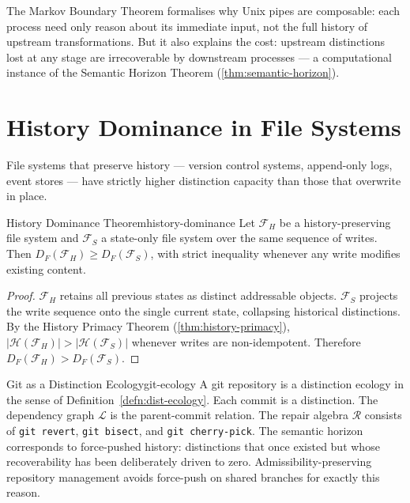 \documentclass[12pt,twoside,openright]{book}
\newcommand{\csicon} {\marginpar{\tiny\color{DistBlue}\faCode}}
\newcommand{\bioicon}{\marginpar{\tiny\color{DistTeal}\faDna}}
\newcommand{\hist}{\mathcal{H}}
\begin{document}
\noindent
The Markov Boundary Theorem formalises why Unix
pipes are composable: each process need only reason about
its immediate input, not the full history of upstream
transformations. But it also explains the cost: upstream
distinctions lost at any stage are irrecoverable by
downstream processes — a computational instance of the
Semantic Horizon Theorem
(\cref{thm:semantic-horizon}).

\section{History Dominance in File Systems}

\bioicon\csicon
File systems that preserve history — version control
systems, append-only logs, event stores — have strictly
higher distinction capacity than those that overwrite
in place.

\begin{theorem}{History Dominance Theorem}{history-dominance}
  Let $\mathcal{F}_H$ be a history-preserving file system
  and $\mathcal{F}_S$ a state-only file system over the
  same sequence of writes.
  Then $D_F(\mathcal{F}_H) \ge D_F(\mathcal{F}_S)$,
  with strict inequality whenever any write modifies
  existing content.
\end{theorem}

\begin{proof}
  $\mathcal{F}_H$ retains all previous states as distinct
  addressable objects.
  $\mathcal{F}_S$ projects the write sequence onto the
  single current state, collapsing historical distinctions.
  By the History Primacy Theorem
  (\cref{thm:history-primacy}),
  $|\hist(\mathcal{F}_H)| > |\hist(\mathcal{F}_S)|$
  whenever writes are non-idempotent.
  Therefore $D_F(\mathcal{F}_H) > D_F(\mathcal{F}_S)$.
\end{proof}

\begin{example}{Git as a Distinction Ecology}{git-ecology}
  \csicon
  A git repository is a distinction ecology in the sense
  of Definition~\ref{defn:dist-ecology}. Each commit is a
  distinction. The dependency graph $\mathcal{L}$ is the
  parent-commit relation. The repair algebra $\mathcal{R}$
  consists of \texttt{git revert}, \texttt{git bisect},
  and \texttt{git cherry-pick}. The semantic horizon
  corresponds to force-pushed history: distinctions that
  once existed but whose recoverability has been
  deliberately driven to zero. Admissibility-preserving
  repository management avoids force-push on shared
  branches for exactly this reason.
\end{example}
\end{document}
